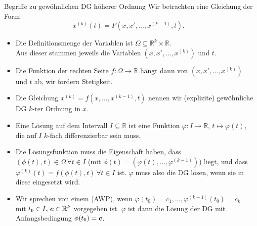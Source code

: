 \begin{Def}
{Begriffe zu gewöhnlichen DG höherer Ordnung}
Wir betrachten eine Gleichung der Form
\begin{equation*}
    x^{(k)}(t)=F(x, x',\ldots,x^{(k-1)},t).
\end{equation*}
\begin{itemize}
    \item Die Definitionsmenge der Variablen ist $\Omega\subseteq\mathbb{R}^k\times\mathbb{R}$.\\
    Aus dieser stammen jeweils die Variablen $(x, x',\ldots,x^{(k)})$ und $t$.
    \item Die Funktion der rechten Seite $f:\Omega\to \mathbb{R}$ hängt dann von $(x, x',\ldots,x^{(k)})$ und $t$ ab, wir fordern Stetigkeit.
    \item Die Gleichung $x^{(k)}=f(x,\ldots, x^{(k-1)},t)$ nennen wir (explizite) gewöhnliche DG $k$-ter Ordnung in $x$.
    \item Eine Lösung auf dem Intervall $I\subseteq\mathbb{R}$ ist eine Funktion $\varphi:I\to\mathbb{R},\,t\mapsto\varphi(t)$, die auf $I$ $k$-fach differenzierbar sein muss.
    \item Die Lösungsfunktion muss die Eigenschaft haben, dass $(\phi(t),t)\in\Omega\,\forall t\in I$ (mit $\phi(t)=(\varphi(t),\ldots,\varphi^{(k-1)})$) liegt, und dass $\varphi^{(k)}(t)=f(\phi(t),t)\,\forall t\in I$ ist. $\varphi$ muss also die DG lösen, wenn sie in diese eingesetzt wird.
    \item Wir sprechen von einem  (AWP), wenn $\varphi(t_0)=c_1,\ldots,\varphi^{(k-1)}(t_0)=c_k$ mit $t_0\in I,\,{{\text{\boldmath${c}$}}}\in\mathbb{R}^k$ vorgegeben ist. $\varphi$ ist dann die Lösung der DG mit Anfangsbedingung $\phi(t_0)={{\text{\boldmath${c}$}}}$.
\end{itemize}
\end{Def}

